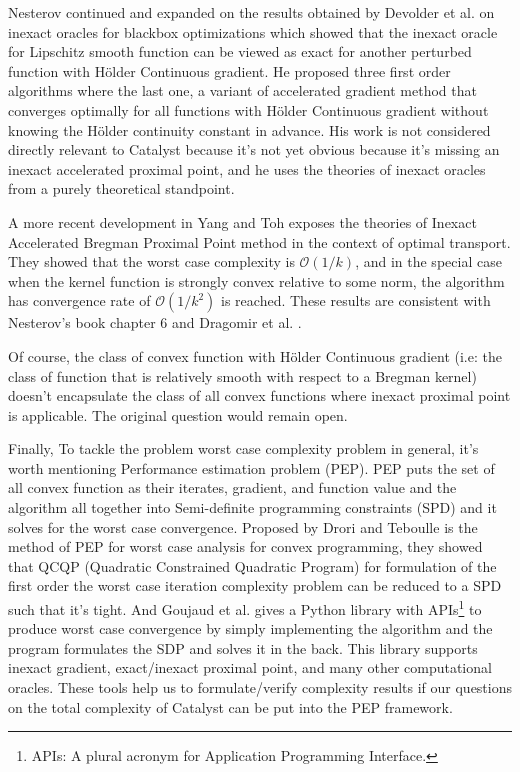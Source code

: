 \documentclass[12pt]{article}
\begin{document}
            Nesterov continued and expanded on the results obtained by Devolder et al. \cite{devolder_first-order_2014} on inexact oracles for blackbox optimizations which showed that the inexact oracle for Lipschitz smooth function can be viewed as exact for another perturbed function with Hölder Continuous gradient. 
            He proposed three first order algorithms where the last one, a variant of accelerated gradient method that converges optimally for all functions with Hölder Continuous gradient without knowing the Hölder continuity constant in advance. 
            His work is not considered directly relevant to Catalyst because it's not yet obvious because it's missing an inexact accelerated proximal point, and he uses the theories of inexact oracles from a purely theoretical standpoint. 
            \par
            A more recent development in Yang and Toh \cite{yang_bregman_2022} exposes the theories of Inexact Accelerated Bregman Proximal Point method in the context of optimal transport. 
            They showed that the worst case complexity is $\mathcal O(1/k)$, and in the special case when the kernel function is strongly convex relative to some norm, the algorithm has convergence rate of $\mathcal O(1/k^2)$ is reached. 
            These results are consistent with Nesterov's book chapter 6 \cite{nesterov_lectures_2018} and Dragomir et al. \cite{dragomir_optimal_2022}. 
            \par
            Of course, the class of convex function with Hölder Continuous gradient (i.e: the class of function that is relatively smooth with respect to a Bregman kernel) doesn't encapsulate the class of all convex functions where inexact proximal point is applicable. 
            The original question would remain open. 
            \par
            Finally, To tackle the problem worst case complexity problem in general, it's worth mentioning Performance estimation problem (PEP). 
            PEP puts the set of all convex function as their iterates, gradient, and function value and the algorithm all together into Semi-definite programming constraints (SPD) and it solves for the worst case convergence. 
            Proposed by Drori and Teboulle \cite{drori_performance_2014} is the method of PEP for worst case analysis for convex programming, they showed that QCQP (Quadratic Constrained Quadratic Program) for formulation of the first order the worst case iteration complexity problem can be reduced to a SPD such that it's tight. 
            And Goujaud et al. \cite{goujaud_pepit_2024} gives a Python library with APIs\footnote{APIs: A plural acronym for Application Programming Interface.} to produce worst case convergence by simply implementing the algorithm and the program formulates the SDP and solves it in the back. 
            This library supports inexact gradient, exact/inexact proximal point, and many other computational oracles. 
            These tools help us to formulate/verify complexity results if our questions on the total complexity of Catalyst can be put into the PEP framework. 




\newpage

\appendix
\end{document}
